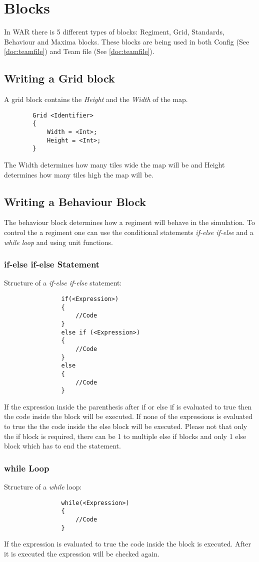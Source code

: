 \section{Blocks}
\label{doc:blocks}
	In WAR there is 5 different types of blocks: Regiment, Grid, Standards, Behaviour and Maxima blocks. 
	These blocks are being used in both Config (See \ref{doc:teamfile}) and Team file (See \ref{doc:teamfile}).
	\subsection{Writing a Grid block}
		A grid block contains the {\it Height} and the {\it Width }of the map.
		\begin{verbatim}
		Grid <Identifier>
		{
			Width = <Int>;
			Height = <Int>;
		}
		\end{verbatim}	
		The Width determines how many tiles wide the map will be and Height determines how many tiles high the map will be.
	\subsection{Writing a Behaviour Block}
		The behaviour block determines how a regiment will behave in the simulation. To control the a regiment one can 
		use the conditional statements {\it if-else if-else} and a {\it while loop} and using unit functions.
		\subsubsection{if-else if-else Statement}
			Structure of a {\it if-else if-else} statement: \\
			\begin{verbatim}
				if(<Expression>)
				{
					//Code
				}
				else if (<Expression>)
				{
					//Code
				}
				else
				{
					//Code
				}
			\end{verbatim}
			If the expression inside the parenthesis after if or else if is evaluated to true then the code inside the block will be executed.
			If none of the expressions is evaluated to true the the code inside the else block will be executed. Please not that only the if block
			is required, there can be 1 to multiple else if blocks and only 1 else block which has to end the statement. \\
		\subsubsection{while Loop}
			Structure of a {\it while} loop: \\			
			\begin{verbatim}
				while(<Expression>)
				{
					//Code
				}
			\end{verbatim}
			If the expression is evaluated to true the code inside the block is executed. After it is executed the expression will be checked again.
